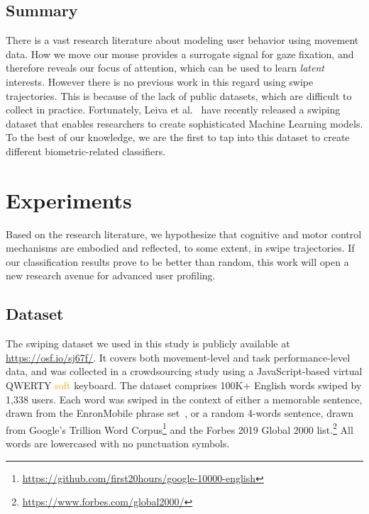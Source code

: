 \documentclass[sn-mathphys, pdflatex]{sn-jnl}
\newcommand{\rev}[1]{\textcolor{orange}{#1}}
\begin{document}
\subsection{Summary}

There is a vast research literature about modeling user behavior using movement data.
How we move our mouse provides a surrogate signal for gaze fixation,
and therefore reveals our focus of attention,
which can be used to learn \emph{latent} interests.
However there is no previous work in this regard using swipe trajectories.
This is because of the lack of public datasets, which are difficult to collect in practice.
Fortunately, Leiva et al.~\cite{Leiva21_swipe} have recently released a swiping dataset
that enables researchers to create sophisticated Machine Learning models.
To the best of our knowledge, we are the first to tap into this dataset
to create different biometric-related classifiers.

\section{Experiments}
\label{sec:experiments}

Based on the research literature,
we hypothesize that cognitive and motor control mechanisms are embodied
and reflected, to some extent, in swipe trajectories.
If our classification results prove to be better than random,
this work will open a new research avenue for advanced user profiling.

\subsection{Dataset}

The swiping dataset we used in this study is publicly available at \url{https://osf.io/sj67f/}.
It covers both movement-level and task performance-level data,
and was collected in a crowdsourcing study using a JavaScript-based virtual QWERTY \rev{soft} keyboard.
The dataset comprises 100K+ English words swiped by 1,338 users.
Each word was swiped in the context of either a memorable sentence,
drawn from the EnronMobile phrase set~\cite{Vertanen11_enron},
or a random 4-words sentence, drawn from Google's Trillion Word Corpus\footnote{\url{https://github.com/first20hours/google-10000-english}}
and the Forbes 2019 Global 2000 list.\footnote{\url{https://www.forbes.com/global2000/}}
All words are lowercased with no punctuation symbols.
\end{document}
